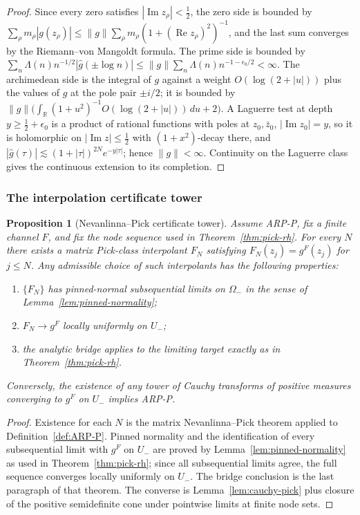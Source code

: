 \documentclass[11pt]{amsart}
\newtheorem{proposition}[theorem]{Proposition}
\theoremstyle{definition}
\theoremstyle{remark}
\theoremstyle{definition}
\renewcommand{\Re}{\operatorname{Re}}
\renewcommand{\Im}{\operatorname{Im}}
\newcommand{\half}{\tfrac{1}{2}}
\newcommand{\R}{\mathbb{R}}
\begin{document}
\begin{proof}
Since every zero satisfies $|\Im z_\rho|<\half$, the zero side is bounded by
$\sum_\rho m_\rho|g(z_\rho)|\le\|g\|\sum_\rho m_\rho(1+(\Re z_\rho)^2)^{-1}$, and the last sum
converges by the Riemann--von Mangoldt formula.  The prime side is bounded by
$\sum_n\Lambda(n)n^{-1/2}|\widehat g(\pm\log n)|\le\|g\|\sum_n\Lambda(n)n^{-1-\epsilon_0/2}<\infty$.
The archimedean side is the integral of $g$ against a weight $O(\log(2+|u|))$ plus the values of $g$
at the pole pair $\pm i/2$; it is bounded by
$\|g\|\bigl(\int_\R(1+u^2)^{-1}O(\log(2+|u|))\,du+2\bigr)$.  A Laguerre test at depth
$y\ge\half+\epsilon_0$ is a product of rational functions with poles at $z_0,\bar z_0$, $|\Im z_0|=y$,
so it is holomorphic on $|\Im z|\le\half$ with $(1+x^2)$-decay there, and
$|\widehat g(\tau)|\lesssim(1+|\tau|)^{2N}e^{-y|\tau|}$; hence $\|g\|<\infty$.  Continuity on the
Laguerre class gives the continuous extension to its completion.
\end{proof}



\subsubsection{The interpolation certificate tower}

\begin{proposition}[Nevanlinna--Pick certificate tower]\label{prop:np-tower}
Assume ARP-P, fix a finite channel $F$, and fix the node sequence used in
Theorem~\ref{thm:pick-rh}.  For every $N$ there exists a matrix Pick-class interpolant $F_N$ satisfying
$F_N(z_j)=g^F(z_j)$ for $j\le N$.  Any admissible choice of such interpolants has the following
properties:
\begin{enumerate}[label=\textnormal{(\roman*)}]
\item $\{F_N\}$ has pinned-normal subsequential limits on $\Omega_-$ in the sense of
Lemma~\ref{lem:pinned-normality};
\item $F_N\to g^F$ locally uniformly on $U_-$;
\item the analytic bridge applies to the limiting target exactly as in Theorem~\ref{thm:pick-rh}.
\end{enumerate}
Conversely, the existence of any tower of Cauchy transforms of positive measures converging to $g^F$ on
$U_-$ implies ARP-P.
\end{proposition}

\begin{proof}
Existence for each $N$ is the matrix Nevanlinna--Pick theorem applied to Definition~\ref{def:ARP-P}.
Pinned normality and the identification of every subsequential limit with $g^F$ on $U_-$ are proved by
Lemma~\ref{lem:pinned-normality} as used in Theorem~\ref{thm:pick-rh}; since all subsequential limits
agree, the full sequence converges locally uniformly on $U_-$.  The bridge conclusion is the last
paragraph of that theorem.  The converse is Lemma~\ref{lem:cauchy-pick} plus closure of the positive
semidefinite cone under pointwise limits at finite node sets.
\end{proof}
\end{document}
